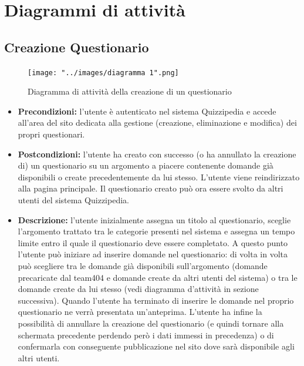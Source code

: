 \documentclass[a4paper,11pt]{article}
\begin{document}
	\section{Diagrammi di attività}
	
\subsection{Creazione Questionario}
\begin{figure}[h!]
\begin{center}
	\centerline{\texttt{[image: "../images/diagramma 1".png]}}
	\caption{Diagramma di attività della creazione di un questionario}
\end{center}
\end{figure}
\begin{itemize}
\item\textbf{Precondizioni:} l'utente è autenticato nel sistema Quizzipedia e accede all'area del sito dedicata alla gestione (creazione, eliminazione e modifica) dei propri questionari.
\item\textbf{Postcondizioni:} l'utente ha creato con successo (o ha annullato la creazione di) un questionario su un argomento a piacere contenente domande già disponibili o create precedentemente da lui stesso. L'utente viene reindirizzato alla pagina principale. Il questionario creato può ora essere svolto da altri utenti del sistema Quizzipedia. %
\item\textbf{Descrizione:} l'utente inizialmente assegna un titolo al questionario, sceglie l'argomento trattato tra le categorie presenti nel sistema e assegna un tempo limite entro il quale il questionario deve essere completato. A questo punto l'utente può iniziare ad inserire domande nel questionario: di volta in volta può scegliere tra le domande già disponibili sull'argomento (domande precaricate dal team404 e domande create da altri utenti del sistema) o tra le domande create da lui stesso (vedi diagramma d'attività in sezione successiva). Quando l'utente ha terminato di inserire le domande nel proprio questionario ne verrà presentata un'anteprima. L'utente ha infine la possibilità di annullare la creazione del questionario (e quindi tornare alla schermata precedente perdendo però i dati immessi in precedenza) o di confermarla con conseguente pubblicazione nel sito dove sarà disponibile agli altri utenti.
\end{itemize}

\newpage
\end{document}
